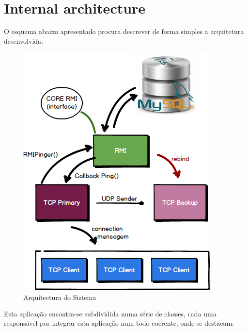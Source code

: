 \documentclass[12pt]{article} %
\begin{document}
\section{Internal architecture}
\label{sub:internal}
O esquema abaixo apresentado procura descrever de forma simples a arquitetura desenvolvida:
\begin{figure}[!ht]
  	\centering
  	\includegraphics[scale=0.7]{sytem_arquitecture.png}
  	\caption{Arquitectura do Sistema}
	\label{figure2}
\end{figure}

Esta aplicação encontra-se subdividida numa série de classes, cada uma responsável por integrar esta aplicação num todo coerente, onde se destacam:
\end{document}
